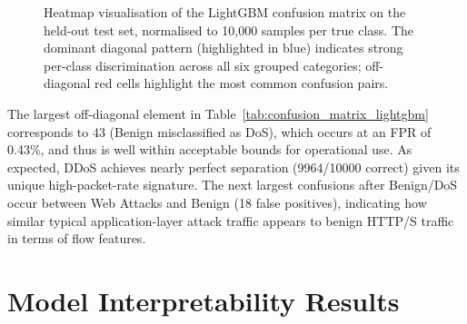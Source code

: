 \begin{figure}[H]
\centering
{}
\caption{Heatmap visualisation of the LightGBM confusion matrix on the held-out test set, normalised to 10{,}000 samples per true class. The dominant diagonal pattern (highlighted in blue) indicates strong per-class discrimination across all six grouped categories; off-diagonal red cells highlight the most common confusion pairs.}
\label{fig:confusion}
\end{figure}

The largest off-diagonal element in Table~\ref{tab:confusion_matrix_lightgbm} corresponds to 43 (Benign misclassified as DoS), which occurs at an FPR of 0.43\%, and thus is well within acceptable bounds for operational use. As expected, DDoS achieves nearly perfect separation (9964/10000 correct) given its unique high-packet-rate signature. The next largest confusions after Benign/DoS occur between Web Attacks and Benign (18 false positives), indicating how similar typical application-layer attack traffic appears to benign HTTP/S traffic in terms of flow features.

\section{Model Interpretability Results}

